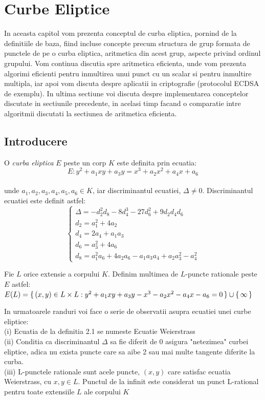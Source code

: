 \chapter{Curbe Eliptice} 

In aceasta capitol vom prezenta conceptul de curba eliptica, pornind de la definitiile de baza, fiind incluse concepte precum structura de grup formata de punctele de pe o curba eliptica, aritmetica din acest grup, aspecte privind ordinul grupului. Vom continua discutia spre aritmetica eficienta, unde vom prezenta algorimi eficienti pentru inmultirea unui punct cu un scalar si pentru inmultire multipla, iar apoi vom discuta despre aplicatii in criptografie (protocolul ECDSA de exemplu). In ultima sectiune voi discuta despre implementarea conceptelor discutate in sectiunile precedente, in acelasi timp facand o comparatie intre algoritmii discutati la sectiunea de aritmetica eficienta.

\section{Introducere}
\label{sec:sec01}

\begin{dfn}
O \textit{curba eliptica} $E$ peste un corp $K$ este definita prin ecuatia:
$$E : y^2 + a_1xy + a_3y = x^3 + a_2x^{2} + a_4x + a_6$$ 
\\unde $a_1, a_2, a_3, a_4, a_5, a_6\in K$, iar discriminantul ecuatiei, $\Delta \neq 0$. Discriminantul ecuatiei este definit astfel:
$$ \begin{cases}
\Delta = -d_2^{2}d_8 - 8d_4^{3} - 27d_6^{2} + 9d_2d_4d_6 \\
d_2 = a_1^{2} + 4a_2 \\
d_4 = 2a_4 + a_1a_3 \\
d_6 = a_3^{2} + 4a_6 \\
d_8 = a_1^{2}a_6 + 4a_2a_6 - a_1a_3a_4 + a_2a_3^{2} - a_4^{2}
\end{cases}$$
\end{dfn}
\begin{dfn}
Fie $L$ orice extensie a corpului $K$. Definim multimea de $L$-puncte rationale peste $E$ astfel: $E(L) = \set {(x, y)\in L\times L: y^2 + a_1xy + a_3y - x^3 - a_2x^{2} - a_4x - a_6 = 0} \cup \set {\infty}$
\end{dfn}
\begin{obs}
In urmatoarele randuri voi face o serie de observatii asupra ecuatiei unei curbe eliptice: \\
(i) Ecuatia de la definitia 2.1 se numeste Ecuatie Weierstrass \\
(ii) Conditia ca discriminantul $\Delta$ sa fie diferit de 0 asigura "netezimea" curbei eliptice, adica nu exista puncte care sa aibe 2 sau mai multe tangente diferite la curba. \\
(iii) L-punctele rationale sunt acele puncte, $(x, y)$ care satisfac ecuatia Weierstrass, cu $x, y \in L$. Punctul de la infinit este considerat un punct L-rational pentru toate extensiile $L$ ale corpului $K$
\end{obs}

